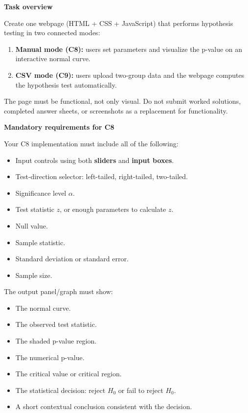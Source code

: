 \documentclass[12pt]{article}
\newcommand{\SubsectionBox}[1]{%
\noindent\colorbox{gray!30}{%
\parbox{\linewidth}{\textbf{#1}}%
}\par\vspace{0.35cm}%
}
\begin{document}
\SubsectionBox{Task overview}
Create one webpage (HTML + CSS + JavaScript) that performs hypothesis testing in two connected modes:
\begin{enumerate}
\item \textbf{Manual mode (C8):} users set parameters and visualize the p-value on an interactive normal curve.
\item \textbf{CSV mode (C9):} users upload two-group data and the webpage computes the hypothesis test automatically.
\end{enumerate}
The page must be functional, not only visual. Do not submit worked solutions, completed answer sheets, or screenshots as a replacement for functionality.

\SubsectionBox{Mandatory requirements for C8}
Your C8 implementation must include all of the following:
\begin{itemize}
\item Input controls using both \textbf{sliders} and \textbf{input boxes}.
\item Test-direction selector: left-tailed, right-tailed, two-tailed.
\item Significance level \(\alpha\).
\item Test statistic \(z\), or enough parameters to calculate \(z\).
\item Null value.
\item Sample statistic.
\item Standard deviation or standard error.
\item Sample size.
\end{itemize}

The output panel/graph must show:
\begin{itemize}
\item The normal curve.
\item The observed test statistic.
\item The shaded p-value region.
\item The numerical p-value.
\item The critical value or critical region.
\item The statistical decision: reject \(H_0\) or fail to reject \(H_0\).
\item A short contextual conclusion consistent with the decision.
\end{itemize}
\end{document}
